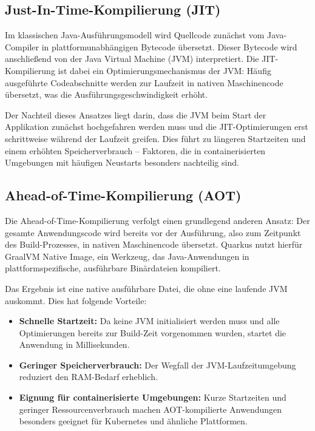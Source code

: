 \subsection{Just-In-Time-Kompilierung (JIT)}

Im klassischen Java-Ausführungsmodell wird Quellcode zunächst vom Java-Compiler in 
plattformunabhängigen Bytecode übersetzt. Dieser Bytecode wird anschließend von der 
Java Virtual Machine (JVM) interpretiert. Die JIT-Kompilierung ist dabei ein 
Optimierungsmechanismus der JVM: Häufig ausgeführte Codeabschnitte werden zur Laufzeit 
in nativen Maschinencode übersetzt, was die Ausführungsgeschwindigkeit erhöht.

Der Nachteil dieses Ansatzes liegt darin, dass die JVM beim Start der Applikation 
zunächst hochgefahren werden muss und die JIT-Optimierungen erst schrittweise während 
der Laufzeit greifen. Dies führt zu längeren Startzeiten und einem erhöhten 
Speicherverbrauch – Faktoren, die in containerisierten Umgebungen mit häufigen 
Neustarts besonders nachteilig sind.

\subsection{Ahead-of-Time-Kompilierung (AOT)}

Die Ahead-of-Time-Kompilierung verfolgt einen grundlegend anderen Ansatz: Der gesamte 
Anwendungscode wird bereits vor der Ausführung, also zum Zeitpunkt des Build-Prozesses, 
in nativen Maschinencode übersetzt. Quarkus nutzt hierfür GraalVM Native Image, ein 
Werkzeug, das Java-Anwendungen in plattformspezifische, ausführbare Binärdateien 
kompiliert.

Das Ergebnis ist eine native ausführbare Datei, die ohne eine laufende JVM auskommt. 
Dies hat folgende Vorteile:

\begin{itemize}
    \item \textbf{Schnelle Startzeit:} Da keine JVM initialisiert werden muss und alle 
    Optimierungen bereits zur Build-Zeit vorgenommen wurden, startet die Anwendung 
    in Millisekunden.
    \item \textbf{Geringer Speicherverbrauch:} Der Wegfall der JVM-Laufzeitumgebung 
    reduziert den RAM-Bedarf erheblich.
    \item \textbf{Eignung für containerisierte Umgebungen:} Kurze Startzeiten und 
    geringer Ressourcenverbrauch machen AOT-kompilierte Anwendungen besonders 
    geeignet für Kubernetes und ähnliche Plattformen.
\end{itemize}

